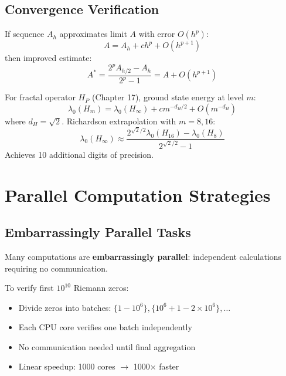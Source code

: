 \subsection{Convergence Verification}

\begin{defn}\label{def:richardson}
If sequence $A_h$ approximates limit $A$ with error $O(h^p)$:
\begin{equation}
A = A_h + c h^p + O(h^{p+1})
\end{equation}
then improved estimate:
\begin{equation}
A^* = \frac{2^p A_{h/2} - A_h}{2^p - 1} = A + O(h^{p+1})
\end{equation}
\end{defn}

\begin{example}
For fractal operator $H_P$ (Chapter 17), ground state energy at level $m$:
\begin{equation}
\lambda_0(H_m) = \lambda_0(H_\infty) + c m^{-d_H/2} + O(m^{-d_H})
\end{equation}
where $d_H = \sqrt{2}$. Richardson extrapolation with $m = 8, 16$:
\begin{equation}
\lambda_0(H_\infty) \approx \frac{2^{\sqrt{2}/2} \lambda_0(H_{16}) - \lambda_0(H_8)}{2^{\sqrt{2}/2} - 1}
\end{equation}
Achieves 10 additional digits of precision.
\end{example}

\section{Parallel Computation Strategies}
\label{sec:parallel-computation}

\subsection{Embarrassingly Parallel Tasks}

Many computations are \textbf{embarrassingly parallel}: independent calculations requiring no communication.

\begin{example}
To verify first $10^{10}$ Riemann zeros:
\begin{itemize}
\item Divide zeros into batches: $\{1-10^6\}, \{10^6+1-2\times 10^6\}, \ldots$
\item Each CPU core verifies one batch independently
\item No communication needed until final aggregation
\item Linear speedup: 1000 cores $\rightarrow$ 1000× faster
\end{itemize}
\end{example}

